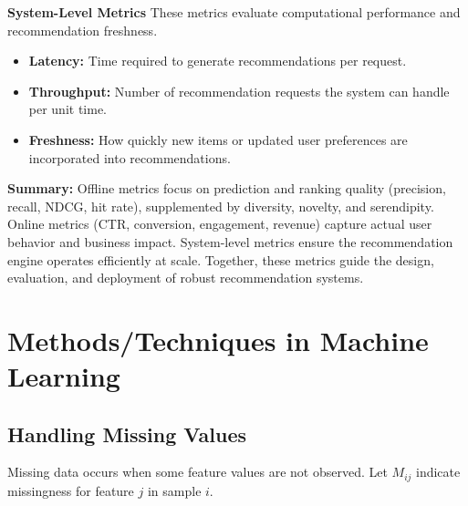 \documentclass[10pt,a4paper]{article}
\begin{document}
	\textbf{System-Level Metrics}  
	These metrics evaluate computational performance and recommendation freshness.
	
	\begin{itemize}
	    \item \textbf{Latency:} Time required to generate recommendations per request.  
	    \item \textbf{Throughput:} Number of recommendation requests the system can handle per unit time.  
	    \item \textbf{Freshness:} How quickly new items or updated user preferences are incorporated into recommendations.
	\end{itemize}
	
	\textbf{Summary:}  
	Offline metrics focus on prediction and ranking quality (precision, recall, NDCG, hit rate), supplemented by diversity, novelty, and serendipity. Online metrics (CTR, conversion, engagement, revenue) capture actual user behavior and business impact. System-level metrics ensure the recommendation engine operates efficiently at scale. Together, these metrics guide the design, evaluation, and deployment of robust recommendation systems.
	
	

	\section{Methods/Techniques in Machine Learning}
	\subsection{Handling Missing Values}

	Missing data occurs when some feature values are not observed. Let $M_{ij}$ indicate missingness for feature $j$ in sample $i$.
\end{document}
